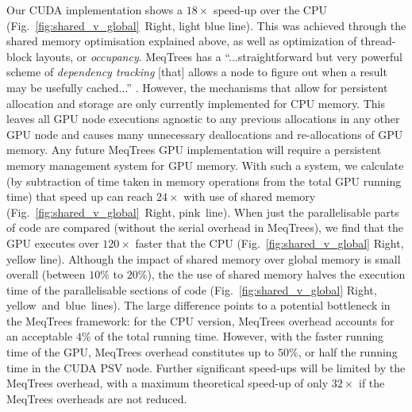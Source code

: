 Our CUDA implementation shows a $18\times$ speed-up over the CPU (Fig.~\ref{fig:shared_v_global}~Right, light blue line). This was achieved through the shared memory optimisation explained above, as well as optimization of  thread-block layouts, or \emph{occupancy}.  MeqTrees has a ``...straightforward but very powerful scheme of \emph{dependency tracking} [that] allows a node to figure out when a result may be usefully cached...'' \citep{Noordam2011}. However,  the mechanisms that allow for persistent allocation and storage are only currently implemented for CPU memory. This leaves all GPU node executions agnostic to any previous allocations in any other GPU node and causes many unnecessary deallocations and re-allocations of GPU memory. Any future MeqTrees GPU implementation will require a persistent memory management system for GPU memory. With such a system, we calculate (by subtraction of time taken in memory operations from the total GPU running time) that speed up can reach $24\times$ with use of shared memory (Fig.~\ref{fig:shared_v_global}~Right, pink~line). When just the parallelisable parts of code are compared (without the serial overhead in MeqTrees), we find that the GPU executes over $120\times$ faster that the CPU (Fig.~\ref{fig:shared_v_global} Right, yellow line). Although the impact of shared memory over global memory is small overall (between $10\%$ to $20\%$), the the use of shared memory halves the execution time of the parallelisable sections of code (Fig.~\ref{fig:shared_v_global} Right, yellow~and~blue~lines). The large difference points to a potential bottleneck in the MeqTrees framework: for the CPU version, MeqTrees overhead accounts for an acceptable $4\%$ of the total running time. However, with the faster running time of the GPU, MeqTrees overhead constitutes up to $50\%$, or half the running time in the CUDA PSV node. Further significant speed-ups will be limited by the MeqTrees overhead, with a maximum theoretical speed-up of only $32\times$ if the MeqTrees overheads are not reduced.

